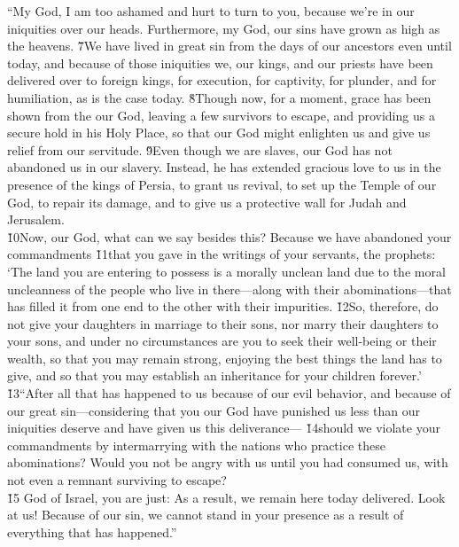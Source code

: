 \begin{poetry}
\poeml ``My God, I am too ashamed and hurt to turn to you, because we're in our iniquities over our heads. Furthermore, my God, our sins have grown as high as the heavens. \v{7}We have lived in great sin from the days of our ancestors even until today, and because of those iniquities we, our kings, and our priests have been delivered over to foreign kings, for execution, for captivity, for plunder, and for humiliation, as is the case today. \v{8}Though now, for a moment, grace has been shown from the  our God, leaving a few survivors to escape, and providing us a secure hold in his Holy Place, so that our God might enlighten us and give us relief from our servitude. \v{9}Even though we are slaves, our God has not abandoned us in our slavery. Instead, he has extended gracious love to us in the presence of the kings of Persia, to grant us revival, to set up the Temple of our God, to repair its damage, and to give us a protective wall for Judah and Jerusalem. \\
\poeml \v{10}Now, our God, what can we say besides this? Because we have abandoned your commandments \v{11}that you gave in the writings of your servants, the prophets: \\
\poeml `The land you are entering to possess is a morally unclean land due to the moral uncleanness of the people who live in there---along with their abominations---that has filled it from one end to the other with their impurities. \v{12}So, therefore, do not give your daughters in marriage to their sons, nor marry their daughters to your sons, and under no circumstances are you to seek their well-being or their wealth, so that you may remain strong, enjoying the best things the land has to give, and so that you may establish an inheritance for your children forever.' \\
\poeml \v{13}``After all that has happened to us because of our evil behavior, and because of our great sin---considering that you our God have punished us less than our iniquities deserve and have given us this deliverance--- \v{14}should we violate your commandments by intermarrying with the nations who practice these abominations? Would you not be angry with us until you had consumed us, with not even a remnant surviving to escape? \\
\poeml \v{15} God of Israel, you are just: As a result, we remain here today delivered. Look at us! Because of our sin, we cannot stand in your presence as a result of everything that has happened.''
\end{poetry}

